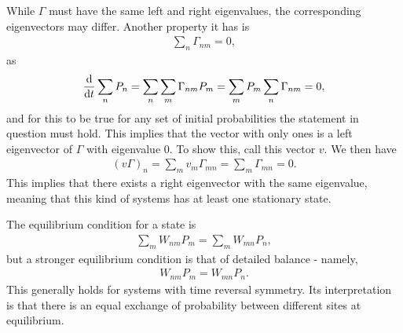 While $\Gamma$ must have the same left and right eigenvalues, the corresponding eigenvectors may differ. Another property it has is
\begin{align*}
	\sum\limits_{n}\Gamma_{nm} = 0,
\end{align*}
as
\begin{align*}
	\dv{t}\sum\limits_{n}P_{n} = \sum\limits_{n}\sum\limits_{m}\Gamma_{nm}P_{m} = \sum\limits_{m}P_{m}\sum\limits_{n}\Gamma_{nm} = 0,
\end{align*}
and for this to be true for any set of initial probabilities the statement in question must hold. This implies that the vector with only ones is a left eigenvector of $\Gamma$ with eigenvalue $0$. To show this, call this vector $v$. We then have
\begin{align*}
	(v\Gamma)_{n} = \sum\limits_{m}v_{m}\Gamma_{mn} = \sum\limits_{m}\Gamma_{mn} = 0.
\end{align*}
This implies that there exists a right eigenvector with the same eigenvalue, meaning that this kind of systems has at least one stationary state.

The equilibrium condition for a state is
\begin{align*}
	\sum\limits_{m}W_{nm}P_{m} = \sum\limits_{m}W_{mn}P_{n},
\end{align*}
but a stronger equilibrium condition is that of detailed balance - namely,
\begin{align*}
	W_{nm}P_{m} = W_{mn}P_{n}.
\end{align*}
This generally holds for systems with time reversal symmetry. Its interpretation is that there is an equal exchange of probability between different sites at equilibrium.
